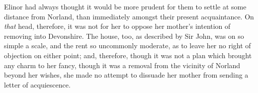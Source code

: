 Elinor had always thought it would be more prudent for them to settle at some distance from Norland, than immediately amongst their present acquaintance. On \textit{that} head, therefore, it was not for her to oppose her mother's intention of removing into Devonshire. The house, too, as described by Sir John, was on so simple a scale, and the rent so uncommonly moderate, as to leave her no right of objection on either point; and, therefore, though it was not a plan which brought any charm to her fancy, though it was a removal from the vicinity of Norland beyond her wishes, she made no attempt to dissuade her mother from sending a letter of acquiescence.